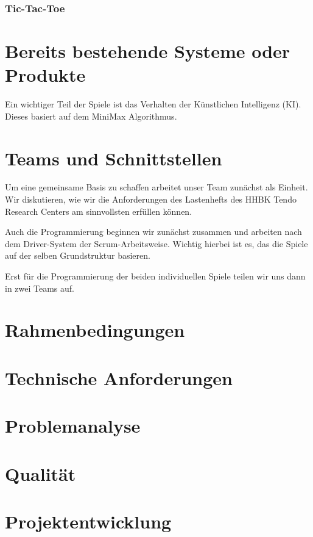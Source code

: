 \documentclass[14pt]{scrartcl}
\begin{document}
\subsubsection{Tic-Tac-Toe}

\section{Bereits bestehende Systeme oder Produkte}


Ein wichtiger Teil der Spiele ist das Verhalten der Künstlichen Intelligenz (KI). Dieses basiert auf dem MiniMax Algorithmus.

\section{Teams und Schnittstellen}

Um eine gemeinsame Basis zu schaffen arbeitet unser Team zunächst als Einheit. Wir diskutieren, wie wir die Anforderungen des Lastenhefts des HHBK Tendo Research Centers am sinnvollsten erfüllen können. \par 

Auch die Programmierung beginnen wir zunächst zusammen und arbeiten nach dem Driver-System der Scrum-Arbeitsweise. 
Wichtig hierbei ist es, das die Spiele auf der selben Grundstruktur basieren. \par

Erst für die Programmierung der beiden individuellen Spiele teilen wir uns dann in zwei Teams auf. \par 

\section{Rahmenbedingungen}

\section{Technische Anforderungen}

\section{Problemanalyse}

\section{Qualität}

\section{Projektentwicklung}

		
\end{document}
